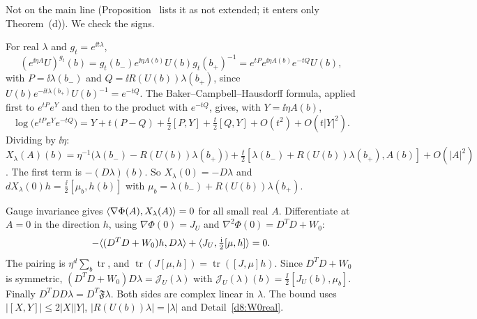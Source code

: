 \begin{detail}\label{d8:ix3}
Not on the main line (Proposition~ lists it as not extended; it enters only Theorem~(d)). We check the signs.
\begin{step}
For real $\lambda$ and $g_t=e^{\ii t\lambda}$,
\[
(e^{\ii\eta A}U)^{g_t}(b)=g_t(b_-)e^{\ii\eta A(b)}U(b)g_t(b_+)^{-1}=e^{tP}e^{\ii\eta A(b)}e^{-tQ}U(b),
\]
with $P=\ii\lambda(b_-)$ and $Q=\ii R(U(b))\lambda(b_+)$, since $U(b)e^{-\ii t\lambda(b_+)}U(b)^{-1}=e^{-tQ}$. The Baker--Campbell--Hausdorff formula, applied first to $e^{tP}e^Y$ and then to the product with $e^{-tQ}$, gives, with $Y=\ii\eta A(b)$,
\[
\log\big(e^{tP}e^Ye^{-tQ}\big)=Y+t(P-Q)+\tfrac t2[P,Y]+\tfrac t2[Q,Y]+O(t^2)+O(t|Y|^2).
\]
Dividing by $\ii\eta$: $X_\lambda(A)(b)=\eta^{-1}\big(\lambda(b_-)-R(U(b))\lambda(b_+)\big)+\frac\ii2[\lambda(b_-)+R(U(b))\lambda(b_+),A(b)]+O(|A|^2)$. The first term is $-(D\lambda)(b)$. So $X_\lambda(0)=-D\lambda$ and $dX_\lambda(0)h=\frac\ii2[\mu_b,h(b)]$ with $\mu_b=\lambda(b_-)+R(U(b))\lambda(b_+)$.
\end{step}
\begin{step}[Differentiation]
Gauge invariance gives $\langle \nabla\Phi(A),X_\lambda(A)\rangle=0$ for all small real $A$. Differentiate at $A=0$ in the direction $h$, using $\nabla\Phi(0)=J_U$ and $\nabla^2\Phi(0)=D^TD+W_0$:
\[
-\langle (D^TD+W_0)h,D\lambda\rangle+\langle J_U,\tfrac{\mathrm i}2[\mu,h]\rangle=0 .
\]
The pairing is $\eta^d\sum_b\operatorname{tr}$, and $\operatorname{tr}(J[\mu,h])=\operatorname{tr}([J,\mu]h)$. Since $D^TD+W_0$ is symmetric, $(D^TD+W_0)D\lambda=\mathcal J_U(\lambda)$ with $\mathcal J_U(\lambda)(b)=\frac\ii2[J_U(b),\mu_b]$. Finally $D^TDD\lambda=D^T\mathfrak F\lambda$. Both sides are complex linear in $\lambda$. The bound uses $|[X,Y]|\le2|X||Y|$, $|R(U(b))\lambda|=|\lambda|$ and Detail~\ref{d8:W0real}.
\end{step}

\end{detail}

